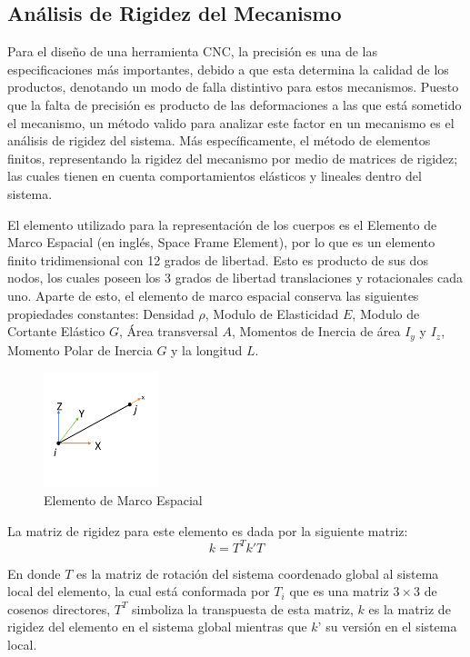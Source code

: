 \subsection{Análisis de Rigidez del Mecanismo}
Para el diseño de una herramienta CNC, la precisión es una de las especificaciones más importantes, debido a que esta determina la calidad de los productos, denotando un modo de falla distintivo para estos mecanismos. Puesto que la falta de precisión es producto de las deformaciones a las que está sometido el mecanismo, un método valido para analizar este factor en un mecanismo es el análisis de rigidez del sistema. Más específicamente, el método de elementos finitos, representando la rigidez del mecanismo por medio de matrices de rigidez; las cuales tienen en cuenta comportamientos elásticos y lineales dentro del sistema.

El elemento utilizado para la representación de los cuerpos es el Elemento de Marco Espacial (en inglés, Space Frame Element), por lo que es un elemento finito tridimensional con 12 grados de libertad. Esto es producto de sus dos nodos, los cuales poseen los 3 grados de libertad translaciones y rotacionales cada uno. Aparte de esto, el elemento de marco espacial conserva las siguientes propiedades constantes: Densidad $\rho$, Modulo de Elasticidad $E$, Modulo de Cortante Elástico $G$, Área transversal $A$, Momentos de Inercia de área $I_{y}$ y $I_{z}$, Momento Polar de Inercia $G$ y la longitud $L$.

\begin{figure}[hb!]
    \centering
    \includegraphics[width=0.30\textwidth]{Cap4_DisenoBasico/Figura/AnalisisRigidez/SPE.pdf}
    \caption{Elemento de Marco Espacial}
    \label{fig:SPE}
\end{figure}

La matriz de rigidez para este elemento es dada por la siguiente matriz:
\begin{equation}
    k = T^{T}k'T
\end{equation}

En donde $T$ es la matriz de rotación del sistema coordenado global al sistema local del elemento, la cual está conformada por $T_{i}$ que es una matriz $3\times3$ de cosenos directores, $T^T$ simboliza la transpuesta de esta matriz, $k$ es la matriz de rigidez del elemento en el sistema global mientras que $k’$ su versión en el sistema local. 

